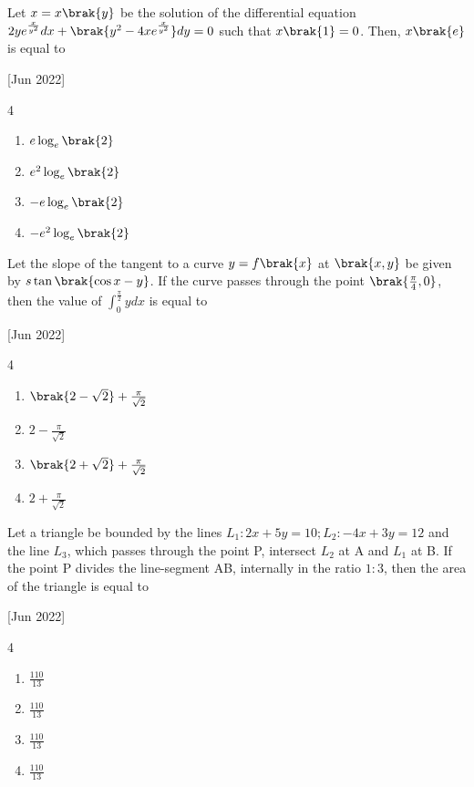     \item Let $x=x\brak{y}$ be the solution of the differential equation $2ye^{\frac{x}{y^2}}dx+\brak{y^2-4xe^{\frac{x}{y^2}}}dy=0$ such that $x\brak{1}=0$. Then, $x\brak{e}$ is equal to
    
    \hfill{[Jun 2022]}
    
        \begin{multicols}{4}
            \begin{enumerate}
                \item $e\log_e\brak{2}$
                \item $e^2\log_e\brak{2}$
                \item $-e\log_e\brak{2}$
                \item $-e^2\log_e\brak{2}$
            \end{enumerate}
        \end{multicols}
        
    \item Let the slope of the tangent to a curve $y=f\brak{x}$ at $\brak{x,y}$ be given by $s\tan\brak{\cos x-y}$. If the curve passes through the point $\brak{\frac{\pi}{4},0}$, then the value of $\int_0^{\frac{\pi}{2}}ydx$ is equal to
    
    \hfill{[Jun 2022]}

        \begin{multicols}{4}
            \begin{enumerate}
                \item $\brak{2-\sqrt{2}}+\frac{\pi}{\sqrt{2}}$
                \item $2-\frac{\pi}{\sqrt{2}}$
                \item $\brak{2+\sqrt{2}}+\frac{\pi}{\sqrt{2}}$
                \item $2+\frac{\pi}{\sqrt{2}}$
            \end{enumerate}
        \end{multicols}

    \item Let a triangle be bounded by the lines $L_1:2x+5y=10;L_2:-4x+3y=12$ and the line $L_3$, which passes through the point P, intersect $L_2$ at A and $L_1$ at B. If the point P divides the line-segment AB, internally in the ratio $1:3$, then the area of the triangle is equal to
    
    \hfill{[Jun 2022]}

        \begin{multicols}{4}
            \begin{enumerate}
                \item $\frac{110}{13}$
                \item $\frac{110}{13}$
                \item $\frac{110}{13}$
                \item $\frac{110}{13}$
            \end{enumerate}
        \end{multicols}
        
